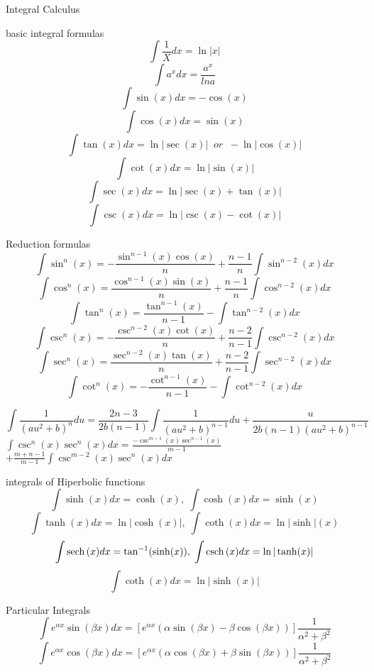 \newpage
\begin{section}{Integral Calculus}
	\begin{subsection}{basic integral formulas}
		$$\int \frac{1}{X} dx = \ln \vert x \vert$$
		$$\int a^{x} dx = \frac{a^x}{ln a } $$
		$$\int \sin (x) dx = -\cos (x) $$
		$$\int \cos (x) dx = \sin (x) $$
		$$\int \tan (x) dx = \ln \vert \sec (x) \vert \;\;or\;\; - \ln \vert \cos (x) \vert$$
		$$\int \cot (x) dx = \ln \vert \sin (x) \vert $$
		$$\int \sec (x) dx = \ln \vert \sec (x) + \tan (x) \vert $$
		$$\int \csc (x) dx = \ln \vert \csc (x) - \cot (x) \vert $$

	\end{subsection}
	\begin{subsection}{Reduction formulas}
		$$\int \sin^n (x) = - \frac{\sin^{n-1}(x)\cos(x)}{n} + \frac{n-1}{n} \int \sin^{n-2} (x) dx $$ 
		$$\int \cos^n (x) =  \frac{\cos^{n-1}(x)\sin(x)}{n} + \frac{n-1}{n} \int \cos^{n-2} (x) dx $$ 
		$$\int \tan^n (x) =  \frac{\tan^{n-1}(x)}{n-1}  - \int \tan^{n-2} (x) dx $$ 
		$$\int \csc^n (x) = - \frac{\csc^{n-2}(x)\cot(x)}{n} + \frac{n-2}{n-1} \int \csc^{n-2} (x) dx $$ 
		$$\int \sec^n (x) =  \frac{\sec^{n-2}(x)\tan(x)}{n} + \frac{n-2}{n-1} \int \sec^{n-2} (x) dx $$ 
		$$\int \cot^n (x) =  -\frac{\cot^{n-1}(x)}{n-1}  - \int \cot^{n-2} (x) dx $$ 



		$$\int \frac{1}{(au^2 + b)^n } du = \frac{2n-3}{2b(n-1)} \int \frac{1}{(au^2 + b )^{n-1}} du + \frac{u}{2b(n-1)(au^2 + b ) ^{n-1}}$$
		$ \int \csc^n (x) \sec^n (x) dx = \frac{-\csc^{m-1} (x) \sec^{n-1} (x) } {m-1} $ $+\frac{m + n-1} {m-1} \int \csc^{m-2} (x) \sec^{n} (x) dx $

	\end{subsection}
	\begin{subsection}{integrals of Hiperbolic functions}
		$$\int \sinh (x) dx = \cosh (x) , \; \int \cosh (x) dx = \sinh (x)$$ 
		$$\int \tanh (x) dx = \ln \vert \cosh (x) \vert , \; \int \coth (x) dx = \ln \vert \sinh \vert (x)$$ 
		$$\int \mathrm{sech} \, (x) dx = \tan^{-1} (\sinh (x) ) , \; \int \mathrm{csch} \, (x) dx = \ln \vert \tanh (x) \vert $$
		$$\int \coth (x) dx = \ln \vert \sinh (x) \vert $$
	\end{subsection}
	\begin{subsection}{Particular Integrals}
$$		\int e^{\alpha x} \sin (\beta x ) dx  = [e^{\alpha x } (\alpha \sin ( \beta x ) - \beta \cos ( \beta x )) ] \frac{1}{\alpha^2 + \beta^2} $$
$$		\int e^{\alpha x} \cos (\beta x ) dx  = [e^{\alpha x } (\alpha \cos ( \beta x ) + \beta \sin ( \beta x )) ] \frac{1}{\alpha^2 + \beta^2} $$


\end{subsection}
\end{section}
